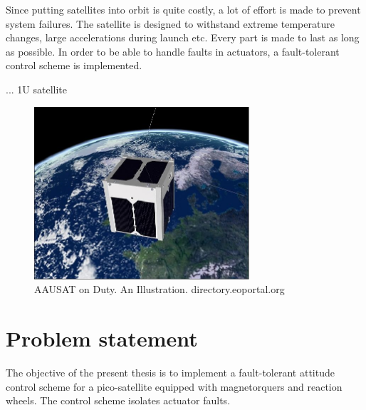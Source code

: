 
 Since putting satellites into orbit is quite costly, a lot of effort is made to prevent system failures. The satellite is designed to withstand extreme temperature changes, large accelerations during launch etc. Every part is made to last as long as possible. In order to be able to handle faults in actuators, a fault-tolerant control scheme is implemented.
 
 ... 1U satellite
 
 
 
 
 \begin{figure}%
 	\centering 
 	\includegraphics[width=80mm]{figures/aausatInSpace.jpg}	
 	\caption{AAUSAT on Duty. An Illustration. directory.eoportal.org}
 	\label{fig:aauinspace}
 \end{figure}

 
 

\section{Problem statement}
The objective of the present thesis is to implement a fault-tolerant attitude control scheme for a pico-satellite equipped with magnetorquers and reaction wheels. The control scheme isolates actuator faults.


